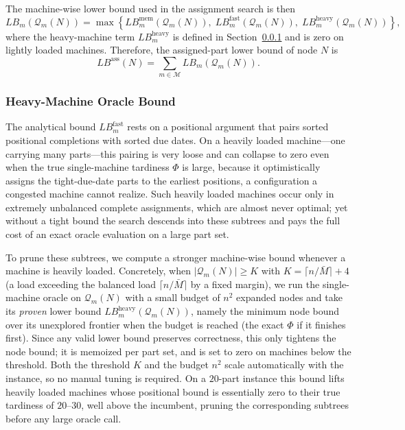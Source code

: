 \documentclass[letterpaper, 10 pt, conference]{ieeeconf}  %
\begin{document}
The machine-wise lower bound used in the assignment search is then
\[
LB_m(\mathcal{Q}_m(N))
=
\max
\left\{
LB_m^{\mathrm{mem}}(\mathcal{Q}_m(N)),
\;
LB_m^{\mathrm{fast}}(\mathcal{Q}_m(N)),
\;
LB_m^{\mathrm{heavy}}(\mathcal{Q}_m(N))
\right\},
\]
where the heavy-machine term $LB_m^{\mathrm{heavy}}$ is defined in
Section~\ref{subsubsec:heavy} and is zero on lightly loaded machines.
Therefore, the assigned-part lower bound of node $N$ is
\[
LB^{\mathrm{ass}}(N)
=
\sum_{m\in\mathcal{M}}
LB_m(\mathcal{Q}_m(N)).
\]

\subsubsection{Heavy-Machine Oracle Bound}
\label{subsubsec:heavy}

The analytical bound $LB_m^{\mathrm{fast}}$ rests on a positional argument that
pairs sorted positional completions with sorted due dates. On a heavily loaded
machine---one carrying many parts---this pairing is very loose and can collapse
to zero even when the true single-machine tardiness $\Phi$ is large, because it
optimistically assigns the tight-due-date parts to the earliest positions, a
configuration a congested machine cannot realize. Such heavily loaded machines
occur only in extremely unbalanced complete assignments, which are almost never
optimal; yet without a tight bound the search descends into these subtrees and
pays the full cost of an exact oracle evaluation on a large part set.

To prune these subtrees, we compute a stronger machine-wise bound whenever a
machine is heavily loaded. Concretely, when
$|\mathcal{Q}_m(N)|\ge K$ with $K=\lceil n/\bar M\rceil+4$ (a load exceeding the
balanced load $\lceil n/\bar M\rceil$ by a fixed margin), we run the
single-machine oracle on $\mathcal{Q}_m(N)$ with a small budget of $n^2$
expanded nodes and take its \emph{proven} lower bound
$LB_m^{\mathrm{heavy}}(\mathcal{Q}_m(N))$, namely the minimum node bound over its
unexplored frontier when the budget is reached (the exact $\Phi$ if it finishes
first). Since any valid lower bound preserves correctness, this only tightens the
node bound; it is memoized per part set, and is set to zero on machines below the
threshold. Both the threshold $K$ and the budget $n^2$ scale automatically with
the instance, so no manual tuning is required. On a $20$-part instance this bound
lifts heavily loaded machines whose positional bound is essentially zero to their
true tardiness of $20$--$30$, well above the incumbent, pruning the
corresponding subtrees before any large oracle call.
\end{document}
